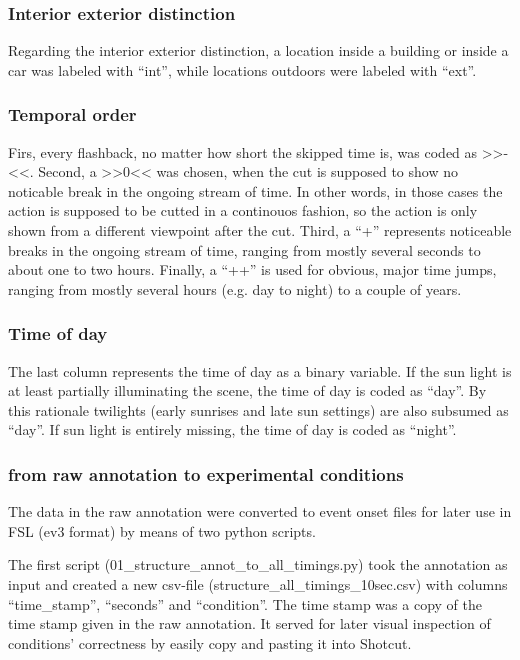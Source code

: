 \documentclass[10pt,a4paper,twocolumn]{article}
\begin{document}
\subsubsection*{Interior exterior distinction }

Regarding the interior exterior distinction, a location inside a building
or inside a car was labeled with ``int'', while locations outdoors
were labeled with ``ext''. 


\subsubsection*{Temporal order}

Firs, every flashback, no matter how short the skipped time is, was
coded as >>-<<. Second, a >>0<< was chosen, when the cut is supposed
to show no noticable break in the ongoing stream of time. In other
words, in those cases the action is supposed to be cutted in a continouos
fashion, so the action is only shown from a different viewpoint after
the cut. Third, a ``+'' represents noticeable breaks in the ongoing
stream of time, ranging from mostly several seconds to about one to
two hours. Finally, a ``++'' is used for obvious, major time jumps,
ranging from mostly several hours (e.g. day to night) to a couple
of years.


\subsubsection*{Time of day }

The last column represents the time of day as a binary variable. If
the sun light is at least partially illuminating the scene, the time
of day is coded as ``day''. By this rationale twilights (early sunrises
and late sun settings) are also subsumed as ``day''. If sun light
is entirely missing, the time of day is coded as ``night''. 


\subsubsection*{from raw annotation to experimental conditions}

The data in the raw annotation were converted to event onset files
for later use in FSL (ev3 format) by means of two python scripts. 

The first script (01\_structure\_annot\_to\_all\_timings.py) took
the annotation as input and created a new csv-file (structure\_all\_timings\_10sec.csv)
with columns ``time\_stamp'', ``seconds'' and ``condition''.
The time stamp was a copy of the time stamp given in the raw annotation.
It served for later visual inspection of conditions' correctness by
easily copy and pasting it into Shotcut. 
\end{document}
